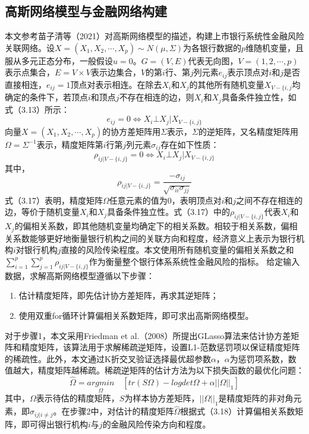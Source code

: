 \documentclass[lang=cn]{elegantpaper}
\begin{document}
\subsection{高斯网络模型与金融网络构建}
本文参考苗子清等（2021）对高斯网络模型的描述，构建上市银行系统性金融风险关联网络。设$X=(X_1,X_2,\cdots,X_p)\sim N(\mu,\Sigma)$为各银行数据的$p$维随机变量，且服从多元正态分布，一般假设$u=0$。$G=(V,E)$代表无向图，$V=(1,2,\cdots,p)$表示点集合，$E=V\times V$表示边集合，$V$的第$i$行、第$j$列元素$e_{ij}$表示顶点对$i$和$j$是否直接相连，$e_{ij}=1$顶点对表示相连。在除去$X_i$和$X_j$的其他所有随机变量$X_{V-\{i,j}$均确定的条件下，若顶点$i$和顶点$j$不存在相连的边，则$X_i$和$X_j$具备条件独立性，如式（3.13）所示：
\begin{equation}
    e_{ij}=0\Longleftrightarrow X_i\bot X_j|X_{V-\{i,j\}}
\end{equation}
向量$X=(X_1,X_2,\cdots,X_p)$的协方差矩阵用$\Sigma$表示，$\Sigma$的逆矩阵，又名精度矩阵用$\Omega=\Sigma^{-1}$表示，精度矩阵第$i$行第$j$列元素$\sigma_{ij}$存在如下性质：
\begin{equation}
    \rho_{ij|V-\{i,j\}}=0\Longleftrightarrow X_i\bot X_j|X_{V-\{i,j\}}
\end{equation}
其中，
\begin{equation}
    \rho_{ij|V-\{i,j\}}=\frac{-\sigma_{ij}}{\sqrt{\sigma_{ii}\sigma_{jj}}}
\end{equation}
式（3.17）表明，精度矩阵$\Omega$任意元素的值为0，表明顶点对$i$和$j$之间不存在相连的边，等价于随机变量$X_i$和$X_j$具备条件独立性。式（3.17）中的$\rho_{ij|V-\{i,j\}}$代表$X_i$和$X_j$的偏相关系数，即其他随机变量均确定下的相关系数。相较于相关系数，偏相关系数能够更好地衡量银行机构之间的关联方向和程度，经济意义上表示为银行机构$i$对银行机构$j$直接的风险传染程度。本文使用所有随机变量的偏相关系数之和$\sum_{i=1}^p \sum_{j=1}^p \rho_{ij|V-\{i,j\}}$作为衡量整个银行体系系统性金融风险的指标。
给定输入数据，求解高斯网络模型遵循以下步骤：
\begin{enumerate}
    \item 估计精度矩阵，即先估计协方差矩阵，再求其逆矩阵；
    \item 使用双重for循环计算偏相关系数矩阵，即可求出高斯网络模型。
\end{enumerate}

对于步骤1，本文采用Friedman et al.（2008）所提出GLasso算法来估计协方差矩阵和精度矩阵，该算法用于求解稀疏逆矩阵，设置L1-范数惩罚项以保证精度矩阵的稀疏性。此外，本文通过K折交叉验证选择最优超参数$\alpha$，$\alpha$为惩罚项系数，数值越大，精度矩阵越稀疏。稀疏逆矩阵的估计方法为以下损失函数的最优化问题：
\begin{equation}
    \hat \Omega=\underset{\Omega}{argmin}\quad [tr(S\Omega)-logdet\Omega+\alpha||\Omega||_1]
\end{equation}
其中，$\Omega$表示待估的精度矩阵，$S$为样本协方差矩阵，$||\Omega||_1$是精度矩阵的非对角元素，即$\sigma_{ij|i\neq j}$。在步骤2中，对估计的精度矩阵$\hat\Omega$根据式（3.18）计算偏相关系数矩阵，即可得出银行机构$i$与$j$的金融风险传染方向和程度。
\end{document}
